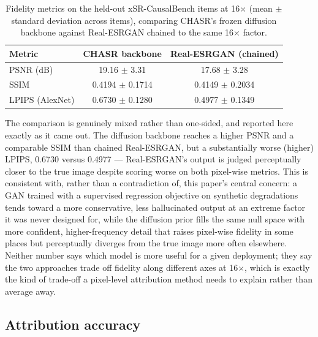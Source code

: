 \documentclass[review]{elsarticle}
\begin{document}
\begin{table}[h]
\centering
\caption{Fidelity metrics on the held-out xSR-CausalBench items at 16$\times$ (mean $\pm$ standard deviation across items), comparing CHASR's frozen diffusion backbone against Real-ESRGAN chained to the same 16$\times$ factor.}
\label{tab:fidelity}
\begin{tabular}{lcc}
\toprule
Metric & CHASR backbone & Real-ESRGAN (chained) \\
\midrule
PSNR (dB) & 19.16 $\pm$ 3.31 & 17.68 $\pm$ 3.28 \\
SSIM & 0.4194 $\pm$ 0.1714 & 0.4149 $\pm$ 0.2034 \\
LPIPS (AlexNet) & 0.6730 $\pm$ 0.1280 & 0.4977 $\pm$ 0.1349 \\
\bottomrule
\end{tabular}
\end{table}

The comparison is genuinely mixed rather than one-sided, and reported here exactly as it came out. The diffusion backbone reaches a higher PSNR and a comparable SSIM than chained Real-ESRGAN, but a substantially worse (higher) LPIPS, 0.6730 versus 0.4977 — Real-ESRGAN's output is judged perceptually closer to the true image despite scoring worse on both pixel-wise metrics. This is consistent with, rather than a contradiction of, this paper's central concern: a GAN trained with a supervised regression objective on synthetic degradations tends toward a more conservative, less hallucinated output at an extreme factor it was never designed for, while the diffusion prior fills the same null space with more confident, higher-frequency detail that raises pixel-wise fidelity in some places but perceptually diverges from the true image more often elsewhere. Neither number says which model is more useful for a given deployment; they say the two approaches trade off fidelity along different axes at 16$\times$, which is exactly the kind of trade-off a pixel-level attribution method needs to explain rather than average away.

\subsection{Attribution accuracy}
\end{document}
